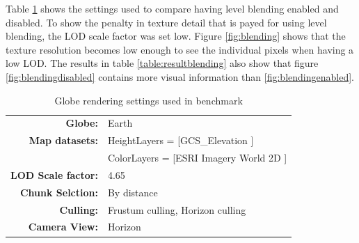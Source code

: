 Table \ref{table:levelblending} shows the settings used to compare having level blending enabled and disabled. To show the penalty in texture detail that is payed for using level blending, the LOD scale factor was set low. Figure \ref{fig:blending} shows that the texture resolution becomes low enough to see the individual pixels when having a low LOD. The results in table \ref{table:resultblending} also show that figure \ref{fig:blendingdisabled} contains more visual information than \ref{fig:blendingenabled}. 

\begin{table}
  \centering
  \caption[]{Globe rendering settings used in benchmark}
    \label{table:levelblending}
  \begin{tabular}{| r l |}
    \hline
      \textbf{Globe:}             & Earth \\
      \textbf{Map datasets:}      & HeightLayers = [GCS\_Elevation \cite{worldelevation3d}] \\
                                  & ColorLayers = [ESRI Imagery World 2D \cite{imageryworld2d}] \\
      \textbf{LOD Scale factor:}  & 4.65 \\
      \textbf{Chunk Selction:}    & By distance \\
      \textbf{Culling:}           & Frustum culling, Horizon culling \\
      \textbf{Camera View:}       & Horizon \\
    \hline
  \end{tabular}
\end{table}

